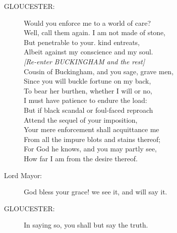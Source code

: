 \documentclass{article}
\begin{document}
\begin{description}
\item[GLOUCESTER:] 
\hspace{1pt}Would you enforce me to a world of care?\\
\hspace{1pt}Well, call them again. I am not made of stone,\\
\hspace{1pt}But penetrable to your. kind entreats,\\
\hspace{1pt}Albeit against my conscience and my soul.\\
{\it [Re-enter BUCKINGHAM and the rest]}\\
\hspace{1pt}Cousin of Buckingham, and you sage, grave men,\\
\hspace{1pt}Since you will buckle fortune on my back,\\
\hspace{1pt}To bear her burthen, whether I will or no,\\
\hspace{1pt}I must have patience to endure the load:\\
\hspace{1pt}But if black scandal or foul-faced reproach\\
\hspace{1pt}Attend the sequel of your imposition,\\
\hspace{1pt}Your mere enforcement shall acquittance me\\
\hspace{1pt}From all the impure blots and stains thereof;\\
\hspace{1pt}For God he knows, and you may partly see,\\
\hspace{1pt}How far I am from the desire thereof.\\
\end{description}
\begin{description}
\item[Lord Mayor:] 
\hspace{1pt}God bless your grace! we see it, and will say it.\\
\end{description}
\begin{description}
\item[GLOUCESTER:] 
\hspace{1pt}In saying so, you shall but say the truth.\\
\end{description}
\end{document}
